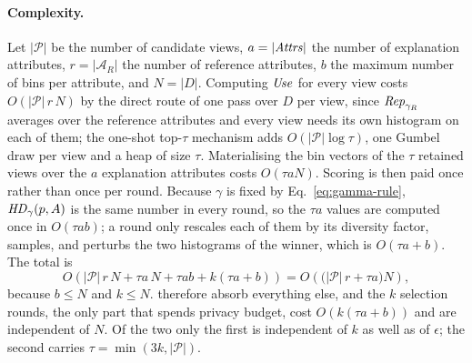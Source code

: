 \paragraph{Complexity.}
\label{subsec:complexity-analysis}
Let $|\mathcal{P}|$ be the number of candidate views, $a=|\mathit{Attrs}|$ the number of explanation attributes, $r=|\mathcal{A}_R|$ the number of reference attributes, $b$ the maximum number of bins per attribute, and $N=|D|$.
Computing $\mathit{Use}$ for every view costs $O(|\mathcal{P}|\,r\,N)$ by the direct route of one pass over $D$ per view, since $\mathit{Rep}_{\gamma_R}$ averages over the reference attributes and every view needs its own histogram on each of them; the one-shot top-$\tau$ mechanism adds $O(|\mathcal{P}|\log\tau)$, one Gumbel draw per view and a heap of size $\tau$.
Materialising the bin vectors of the $\tau$ retained views over the $a$ explanation attributes costs $O(\tau a N)$.
Scoring is then paid once rather than once per round.
Because $\gamma$ is fixed by Eq.~\eqref{eq:gamma-rule}, $\mathit{HD}_\gamma(p,A)$ is the same number in every round, so the $\tau a$ values are computed once in $O(\tau a b)$; a round only rescales each of them by its diversity factor, samples, and perturbs the two histograms of the winner, which is $O(\tau a+b)$.
The total is
\[
O\!\left(|\mathcal{P}|\,r\,N + \tau a\, N + \tau a b + k(\tau a + b)\right)
= O\!\left(\big(|\mathcal{P}|\,r + \tau a\big)N\right),
\]
because $b\le N$ and $k\le N$.
 therefore absorb everything else, and the $k$ selection rounds, the only part that spends privacy budget, cost $O(k(\tau a+b))$ and are independent of $N$.
Of the two  only the first is independent of $k$ as well as of $\epsilon$; the second carries $\tau=\min(3k,|\mathcal{P}|)$.


